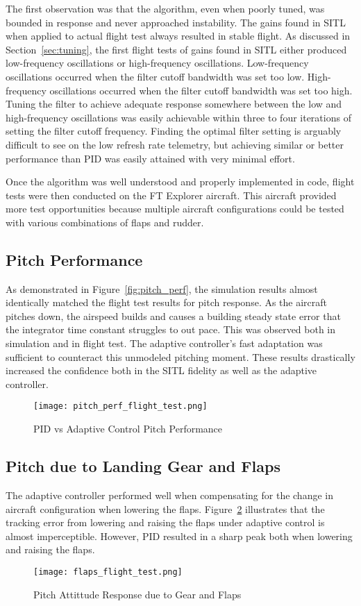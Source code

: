 The first observation was that the algorithm, even when poorly tuned, was bounded in response and never approached instability.  The gains found in \ac{SITL} when applied to actual flight test always resulted in stable flight.  As discussed in Section~\ref{sec:tuning}, the first flight tests of gains found in \ac{SITL} either produced low-frequency oscillations or high-frequency oscillations.  Low-frequency oscillations occurred when the \Lone filter cutoff bandwidth was set too low.  High-frequency oscillations occurred when the \Lone filter cutoff bandwidth was set too high.  Tuning the filter to achieve adequate response somewhere between the low and high-frequency oscillations was easily achievable within three to four iterations of setting the filter cutoff frequency.  Finding the optimal filter setting is arguably difficult to see on the low refresh rate telemetry, but achieving similar or better performance than \ac{PID} was easily attained with very minimal effort.

Once the algorithm was well understood and properly implemented in code, flight tests were then conducted on the FT Explorer aircraft.  This aircraft provided more test opportunities because multiple aircraft configurations could be tested with various combinations of flaps and rudder.  

\subsection{Pitch Performance}
As demonstrated in Figure~\ref{fig:pitch_perf}, the simulation results almost identically matched the flight test results for pitch response.  As the aircraft pitches down, the airspeed builds and causes a building steady state error that the integrator time constant struggles to out pace.  This was observed both in simulation and in flight test.  The \Lone adaptive controller's fast adaptation was sufficient to counteract this unmodeled pitching moment.  These results drastically increased the confidence both in the \ac{SITL} fidelity as well as the \Lone adaptive controller.
\begin{figure}[h!]
 \centering
  \texttt{[image: pitch\_perf\_flight\_test.png]}
  \caption{PID vs \Lone Adaptive Control Pitch Performance}
  \label{fig:pitch_perf_flight_test}
\end{figure}

\subsection{Pitch due to Landing Gear and Flaps}
The \Lone adaptive controller performed well when compensating for the change in aircraft configuration when lowering the flaps.  Figure~\ref{fig:flaps_flight_test} illustrates that the tracking error from lowering and raising the flaps under adaptive control is almost imperceptible.  However, \ac{PID} resulted in a sharp peak both when lowering and raising the flaps.
\begin{figure}[h!]
 \centering
  \texttt{[image: flaps\_flight\_test.png]}
  \caption{Pitch Attittude Response due to Gear and Flaps}
  \label{fig:flaps_flight_test}
\end{figure}

